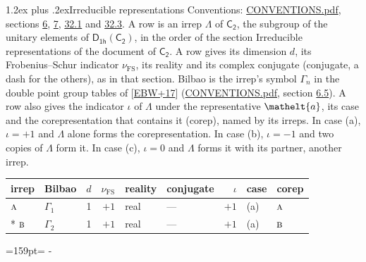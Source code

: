\documentclass[10pt,a4paper]{article}
\makeatletter
\renewcommand\section{\@startsection{section}{1}{\z@}{-3ex plus -1ex minus -.2ex}%
  {1.2ex plus .2ex}{\normalfont\large\sffamily\bfseries\color{parttitle}}}
\newcommand{\needspace}[1]{\par\penalty-100\begingroup\dimen0=#1\relax\dimen2=\pagegoal
  \advance\dimen2-\pagetotal\ifdim\dimen0>\dimen2\relax\ifdim\dimen2>0pt\vfil\break\fi\fi
  \endgroup}
\numberwithin{equation}{section}
\newcommand{\eltfont}[1]{{\let\sigma\eltsigma\mathelt{#1}}}
\newcommand{\grp}[1]{\mathsf{#1}}
\newcommand{\irr}[1]{\text{\normalfont\scshape #1}}
\newcommand{\elt}[1]{\eltfont{#1}}
\newcommand{\fsind}{\nu_{\mathrm{FS}}}
\makeatother
\begin{document}
\section{Irreducible representations}\label{s:irreps}
Conventions: \href{../../CONVENTIONS.pdf}{CONVENTIONS.pdf}, sections \href{../../../rotation/CONVENTIONS.pdf\#conv.6}{6}, \href{../../../rotation/CONVENTIONS.pdf\#conv.7}{7}, \href{../../CONVENTIONS.pdf\#conv.32.1}{32.1} and \href{../../CONVENTIONS.pdf\#conv.32.3}{32.3}.
\leavevmode\label{n:irrep.Delta}A row is an irrep $\Lambda$ of $\grp{C_{2}}$, the subgroup of the unitary elements of $\grp{D_{1h}}(\grp{C_{2}})$, in the order of the section Irreducible representations of the document of \href{../../../rotation/data/pdf/C2.pdf}{$\grp{C_{2}}$}. \label{n:index.dimension}\label{n:index.frobenius}\label{n:head.irrep}\label{n:head.reality}\label{n:head.conjugate}A row gives its dimension $d$, its Frobenius--Schur indicator $\fsind$, its reality and its complex conjugate (conjugate, a dash for the others), as in that section. \label{n:head.bilbao}\label{n:irrep.alias.gamma}Bilbao is the irrep's symbol $\Gamma_n$ in the double point group tables of [\href{../../../REFERENCES.pdf\#ref.EBW+17}{EBW+17}] (\href{../../CONVENTIONS.pdf}{CONVENTIONS.pdf}, section \href{../../../rotation/CONVENTIONS.pdf\#conv.6.5}{6.5}). \label{n:head.case.corep}\label{n:head.corep}A row also gives the indicator $\iota$ of $\Lambda$ under the representative $\elt{a}$, its case and the corepresentation that contains it (corep), named by its irreps. In case (a), $\iota = +1$ and $\Lambda$ alone forms the corepresentation. In case (b), $\iota = -1$ and two copies of $\Lambda$ form it. In case (c), $\iota = 0$ and $\Lambda$ forms it with its partner, another irrep.
\setlength{\emergencystretch}{2em}\par\setlength{\emergencystretch}{0pt}
{\small\renewcommand{\arraystretch}{1.25}\setlength{\tabcolsep}{4pt}\begin{longtable}{@{}llrrllrll@{}}\toprule
irrep & Bilbao & $d$ & $\fsind$ & reality & conjugate & $\iota$ & case & corep\\\midrule\endhead
\bottomrule\endfoot\endlastfoot
$\irr{a}$ & $\Gamma_{1}$ & 1 & $+1$ & real & --- & $+1$ & (a) & $\irr{a}$\\*
$\irr{b}$ & $\Gamma_{2}$ & 1 & $+1$ & real & --- & $+1$ & (a) & $\irr{b}$\\
\bottomrule\end{longtable}}
\needspace{159pt}
\end{document}
